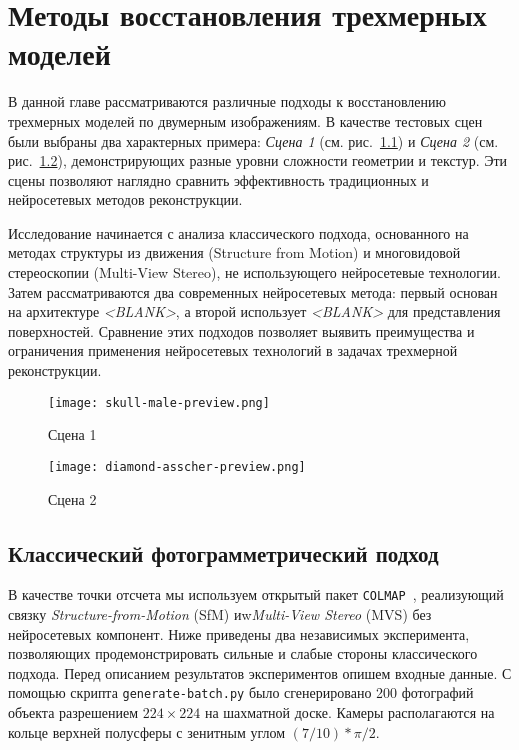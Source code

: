 \chapter{Методы восстановления трехмерных моделей}

В данной главе рассматриваются различные подходы к восстановлению трехмерных
моделей по двумерным изображениям. В качестве тестовых сцен были выбраны два
характерных примера: \textit{Сцена 1} (см. рис.~\ref{fig:scene1}) и
\textit{Сцена 2} (см. рис.~\ref{fig:scene2}), демонстрирующих разные уровни
сложности геометрии и текстур. Эти сцены позволяют наглядно сравнить
эффективность традиционных и нейросетевых методов реконструкции.

Исследование начинается с анализа классического подхода, основанного на методах
структуры из движения (Structure from Motion) и многовидовой стереоскопии
(Multi-View Stereo), не использующего нейросетевые технологии. Затем
рассматриваются два современных нейросетевых метода: первый основан на
архитектуре \textit{<BLANK>}, а второй использует
\textit{<BLANK>} для представления поверхностей. Сравнение этих подходов
позволяет выявить преимущества и ограничения применения нейросетевых технологий
в задачах трехмерной реконструкции.

\begin{figure}[t]
    \centering
    \texttt{[image: skull-male-preview.png]}
    \caption{Сцена 1}
    \label{fig:scene1}
\end{figure}

\begin{figure}[t]
    \centering
    \texttt{[image: diamond-asscher-preview.png]}
    \caption{Сцена 2}
    \label{fig:scene2}
\end{figure}

\section{Классический фотограмметрический подход}

В качестве точки отсчета мы используем открытый пакет
\texttt{COLMAP} \cite{10.1109/CVPR.2016.4454}, реализующий связку
\textit{Structure-from-Motion} (SfM) иw\textit{Multi-View Stereo} (MVS)
без нейросетевых компонент. Ниже приведены два независимых эксперимента,
позволяющих продемонстрировать сильные и слабые стороны классического подхода.
Перед описанием результатов экспериментов опишем входные данные. С помощью
скрипта \texttt{generate-batch.py} было сгенерировано 200 фотографий объекта разрешением
$224 \times 224$ на шахматной доске. Камеры располагаются на кольце верхней полусферы
с зенитным углом $(7 / 10) * \pi / 2$.

